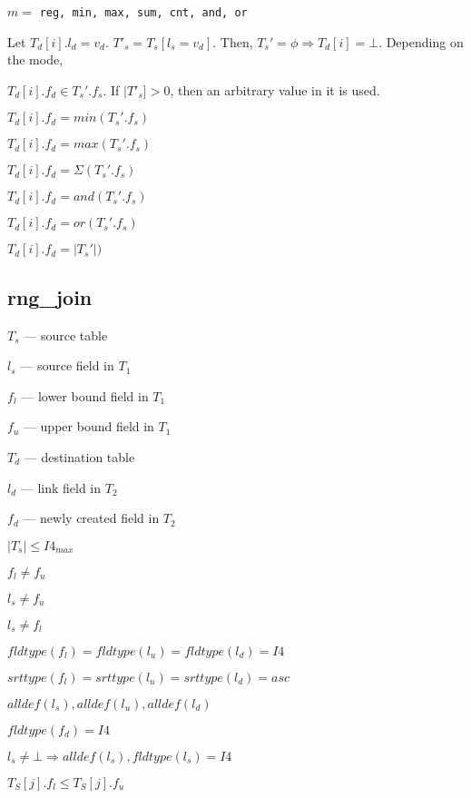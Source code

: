 \be
\item 
\(m = \) {\tt reg, min, max, sum, cnt, and, or}
\ee


Let \(T_d[i].l_d = v_d\). \(T'_s = T_s[l_s = v_d]\). 
Then, \(T_s' = \phi \Rightarrow T_d[i] = \bot\).  Depending on the mode, 
\bd
\item [reg] \(T_d[i].f_d \in T_s'.f_s\). If \(|T'_s] > 0 \), then an
arbitrary value in it is used.
\item [min] \(T_d[i].f_d = min(T_s'.f_s)\)
\item [max] \(T_d[i].f_d = max(T_s'.f_s)\)
\item [sum] \(T_d[i].f_d = \Sigma(T_s'.f_s)\)
\item [and] \(T_d[i].f_d = and(T_s'.f_s)\)
\item [or ] \(T_d[i].f_d = or(T_s'.f_s)\)
\item [cnt] \(T_d[i].f_d = |T_s'|)\)
\ed

\subsection{rng\_join}
\label{rng_join}

\be
\item \(T_s\) --- source table
\item \(l_s\) --- source field in \(T_1\)
\item \(f_l\) --- lower bound field in \(T_1\)
\item \(f_u\) --- upper bound field in \(T_1\)
\item \(T_d\) --- destination table
\item \(l_d\) --- link field in \(T_2\)
\item \(f_d\) --- newly created field in \(T_2\)
\ee

%
\be
\item \(|T_s| \leq I4_{max}\)
\item \(f_l \neq f_u\)
\item \(l_s \neq f_u\)
\item \(l_s \neq f_l\)
\item \(fldtype(f_l) = fldtype(l_u) = fldtype(l_d) = I4\)
\item \(srttype(f_l) = srttype(l_u) = srttype(l_d) = asc\)
\item \(alldef(l_s),   alldef(l_u),   alldef(l_d)\)
\item \(fldtype(f_d) = I4\)
\item \(l_s \neq \bot \Rightarrow alldef(l_s), fldtype(l_s) = I4\)
\item \(T_S[j].f_l \leq T_S[j].f_u\)
\ee


